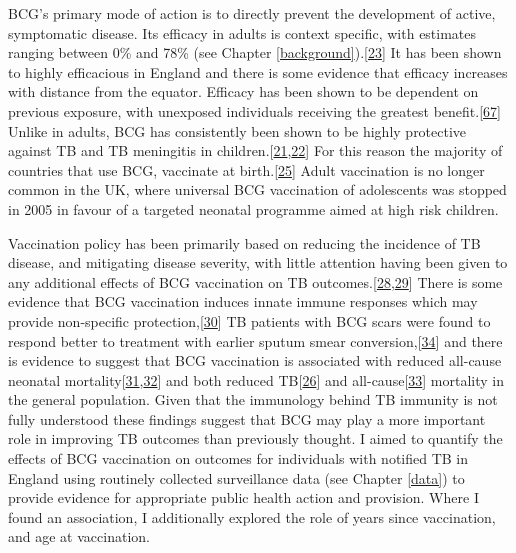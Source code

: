 \documentclass[11pt,twoside]{bristolthesis}
\begin{document}
  BCG's primary mode of action is to directly prevent the development of active, symptomatic disease. Its efficacy in adults is context specific, with estimates ranging between 0\% and 78\% (see Chapter \ref{background}).{[}\protect\hyperlink{ref-Mangtani2014a}{23}{]} It has been shown to highly efficacious in England and there is some evidence that efficacy increases with distance from the equator. Efficacy has been shown to be dependent on previous exposure, with unexposed individuals receiving the greatest benefit.{[}\protect\hyperlink{ref-Barreto2014a}{67}{]} Unlike in adults, BCG has consistently been shown to be highly protective against TB and TB meningitis in children.{[}\protect\hyperlink{ref-Rodrigues1993}{21},\protect\hyperlink{ref-Colditz1994}{22}{]} For this reason the majority of countries that use BCG, vaccinate at birth.{[}\protect\hyperlink{ref-Zwerling2011}{25}{]} Adult vaccination is no longer common in the UK, where universal BCG vaccination of adolescents was stopped in 2005 in favour of a targeted neonatal programme aimed at high risk children.
  
  Vaccination policy has been primarily based on reducing the incidence of TB disease, and mitigating disease severity, with little attention having been given to any additional effects of BCG vaccination on TB outcomes.{[}\protect\hyperlink{ref-Fine2005a}{28},\protect\hyperlink{ref-Teo2006}{29}{]} There is some evidence that BCG vaccination induces innate immune responses which may provide non-specific protection,{[}\protect\hyperlink{ref-Kleinnijenhuis2012}{30}{]} TB patients with BCG scars were found to respond better to treatment with earlier sputum smear conversion,{[}\protect\hyperlink{ref-Jeremiah2010}{34}{]} and there is evidence to suggest that BCG vaccination is associated with reduced all-cause neonatal mortality{[}\protect\hyperlink{ref-Garly2003}{31},\protect\hyperlink{ref-Higgins}{32}{]} and both reduced TB{[}\protect\hyperlink{ref-Abubakar2013}{26}{]} and all-cause{[}\protect\hyperlink{ref-Rieckmann2016}{33}{]} mortality in the general population. Given that the immunology behind TB immunity is not fully understood these findings suggest that BCG may play a more important role in improving TB outcomes than previously thought. I aimed to quantify the effects of BCG vaccination on outcomes for individuals with notified TB in England using routinely collected surveillance data (see Chapter \ref{data}) to provide evidence for appropriate public health action and provision. Where I found an association, I additionally explored the role of years since vaccination, and age at vaccination.
  
\end{document}
